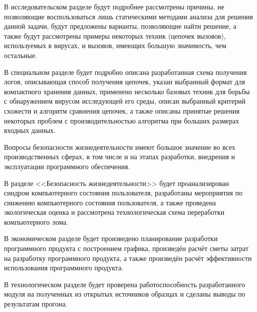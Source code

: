 В исследовательском разделе будут подробнее рассмотрены причины, не позволяющие воспользоваться лишь статическими методами анализа для решения данной задачи, будут предложены варианты, позволяющие найти решение, а также будут рассмотрены примеры некоторых техник (цепочек вызовов), используемых в вирусах, и вызовов, имеющих большую значимость, чем остальные.

В специальном разделе будет подробно описана разработанная схема получения логов, описывающая способ получения цепочек, указан выбранный формат для компактного хранения данных, применено несколько базовых техник для борьбы с обнаружением вирусом исследующей его среды, описан выбранный критерий схожести и алгоритм сравнения цепочек, а также описаны принятые решения некоторых проблем с производительностью алгоритма при больших размерах входных данных.

Вопросы безопасности жизнедеятельности имеют большое значение во всех производственных сферах, в том числе и на этапах разработки, внедрения и эксплуатации программного обеспечения.

В разделе <<Безопасность жизнедеятельности>> будет проанализирован синдром компьютерного состояния пользователя, разработаны мероприятия по снижению компьютерного состояния пользователя, а также проведена экологическая оценка и рассмотрена технологическая схема переработки компьютерного лома.

В экономическом разделе будет произведено планирование разработки программного продукта с построением графика, произведён расчёт сметы затрат на разработку программного продукта, а также произведён расчёт эффективности использования программного продукта.

В технологическом разделе будет проверена работоспособность разработанного модуля на полученных из открытых источников образцах и сделаны выводы по результатам прогона.
